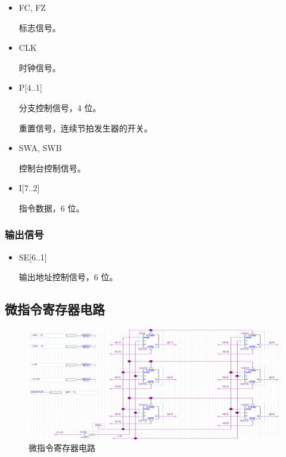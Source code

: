 \begin{itemize}
    \item FC, FZ
    
    标志信号。
    
    \item CLK
    
    时钟信号。
    
    \item P[4..1]
    
    分支控制信号，4 位。
    
    重置信号，连续节拍发生器的开关。
    
    \item SWA, SWB
    
    控制台控制信号。
    
    \item I[7..2]
    
    指令数据，6 位。
    
\end{itemize} 

\subsubsection{输出信号}

\begin{itemize}
    \item SE[6..1]
    
    输出地址控制信号，6 位。
    
\end{itemize}

\subsection{微指令寄存器电路}

\begin{figure}[H]
\centering
\includegraphics[width=\textwidth]{images/prin5_2.png}
\caption{微指令寄存器电路}
\label{fig:prin5_2}
\end{figure}

